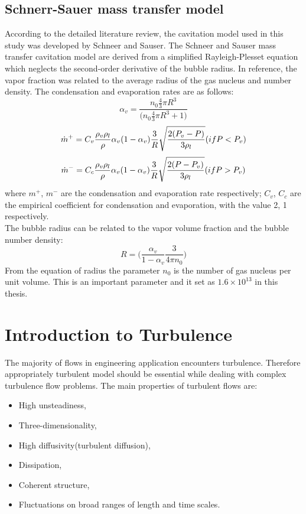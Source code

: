 \subsection{Schnerr-Sauer mass transfer model}
According to the detailed literature review, the cavitation model used in this study was developed by Schneer and Sauser. The Schneer and Sauser mass transfer cavitation model are derived from a simplified 
Rayleigh-Plesset equation which neglects the second-order derivative of the bubble radius. In reference\cite{Zhao2021, Hidalgo2014}, the vapor fraction was related to the average radius of the gas nucleus and number density.
The condensation and evaporation rates are as follows:
\begin{equation}
{{\alpha}_v}=\frac{{{n}_0}{\frac{4}{3}}\pi{{R}^3}}{\Bigg({n_0}{\frac{4}{3}}\pi{R^3}+1 \Bigg)}
\end{equation}
\begin{equation}
{{\dot m}^+}={C_v}{\frac{{{\rho}_v}{\rho}_l}{\rho}}{{\alpha}_v}{(1-{\alpha}_v)}{\frac{3}{R}}{\sqrt{\frac{2({P_v}-{P})}{3{\rho}_l}}} \\     
({if P<P_v})
\end{equation}
 \begin{equation}
 {{\dot{m}}^-}={C_c}{\frac{{{\rho}_v}{\rho}_l}{\rho}}{{\alpha}_v}{(1-{\alpha}_v)}{\frac{3}{R}}{\sqrt{\frac{2({P}-{P_v})}{3{\rho}_l}}} \\ 
 ({if P>P_v})
 \end{equation}
 where ${m}^+$, ${m}^-$ are the condensation and evaporation rate respectively; $C_v$, $C_c$ are the empirical coefficient for condensation and evaporation, with the value 2, 1 respectively.\\
 The bubble radius can be related to the vapor volume fraction and the bubble number density:
 \begin{equation}
 R=\Bigg({\frac{{{\alpha}_v}}{1-{{\alpha}_v}}}{\frac{3}{4{\pi}{n_0}}}\Bigg)
 \end{equation}
  From the equation of radius the parameter $n_0$ is the number of gas nucleus per unit volume. This is an important parameter and it set as $1.6 \times 10^{13}$ in this thesis.
  
\section{Introduction to Turbulence}
The majority of flows in engineering application encounters turbulence\cite{ANSYS}. Therefore appropriately turbulent model should be essential while dealing with complex turbulence flow problems. 
The main properties of turbulent flows are:
\begin{itemize}
\item High unsteadiness,
\item Three-dimensionality,
\item High diffusivity(turbulent diffusion),
\item Dissipation,
\item Coherent structure,
\item Fluctuations on broad ranges of length and time scales.
\end{itemize}
